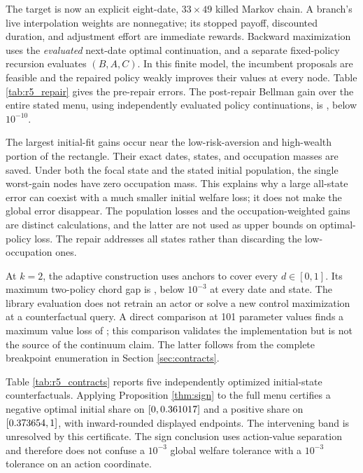 The target is now an explicit eight-date, $33\times49$ killed Markov chain. A branch's live interpolation weights are nonnegative; its stopped payoff, discounted duration, and adjustment effort are immediate rewards. Backward maximization uses the \emph{evaluated} next-date optimal continuation, and a separate fixed-policy recursion evaluates $(B,A,C)$. In this finite model, the incumbent proposals are feasible and the repaired policy weakly improves their values at every node. Table \ref{tab:r5_repair} gives the pre-repair errors. The post-repair Bellman gain over the entire stated menu, using independently evaluated policy continuations, is \NBORepairGain{}, below $10^{-10}$.


The largest initial-fit gains occur near the low-risk-aversion and high-wealth portion of the rectangle. Their exact dates, states, and occupation masses are saved. Under both the focal state and the stated initial population, the single worst-gain nodes have zero occupation mass. This explains why a large all-state error can coexist with a much smaller initial welfare loss; it does not make the global error disappear. The population losses and the occupation-weighted gains are distinct calculations, and the latter are not used as upper bounds on optimal-policy loss. The repair addresses all states rather than discarding the low-occupation ones.

At $k=2$, the adaptive construction uses \NBOAnchors{} anchors to cover every $d\in[0,1]$. Its maximum two-policy chord gap is \NBOCertificate{}, below $10^{-3}$ at every date and state. The library evaluation does not retrain an actor or solve a new control maximization at a counterfactual query. A direct comparison at 101 parameter values finds a maximum value loss of \NBOContractObservedLoss{}; this comparison validates the implementation but is not the source of the continuum claim. The latter follows from the complete breakpoint enumeration in Section \ref{sec:contracts}.

Table \ref{tab:r5_contracts} reports five independently optimized initial-state counterfactuals. Applying Proposition \ref{thm:sign} to the full menu certifies a negative optimal initial share on $[0,0.361017]$ and a positive share on $[0.373654,1]$, with inward-rounded displayed endpoints. The intervening band is unresolved by this certificate. The sign conclusion uses action-value separation and therefore does not confuse a $10^{-3}$ global welfare tolerance with a $10^{-3}$ tolerance on an action coordinate.



